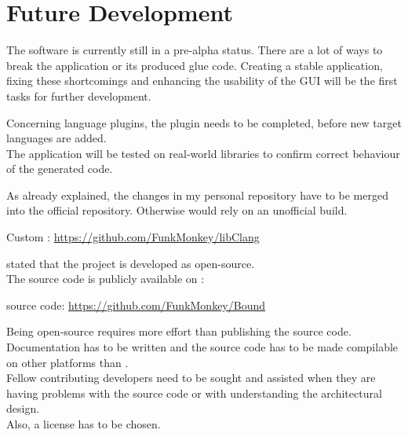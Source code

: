 \chapter{Future Development}
\label{chap:FutureDevelopment}

The software is currently still in a pre-alpha status. There are a lot of ways to break the application or its produced glue code. Creating a stable application, fixing these shortcomings and enhancing the usability of the GUI will be the first tasks for further development.

Concerning language plugins, the  plugin needs to be completed, before new target languages are added.\\
The application will be tested on real-world libraries to confirm correct behaviour of the generated code.

As already explained, the changes in my personal  repository have to be merged into the official repository. Otherwise  would rely on an unofficial  build.

\hspace{20pt} Custom : \url{https://github.com/FunkMonkey/libClang}

 stated that the project is developed as open-source.\\
The source code is publicly available on :

\hspace{20pt}  source code: \url{https://github.com/FunkMonkey/Bound}

Being open-source requires more effort than publishing the source code. Documentation has to be written and the source code has to be made compilable on other platforms than .\\
Fellow contributing developers need to be sought and assisted when they are having problems with the source code or with understanding the architectural design.\\
Also, a license has to be chosen.

